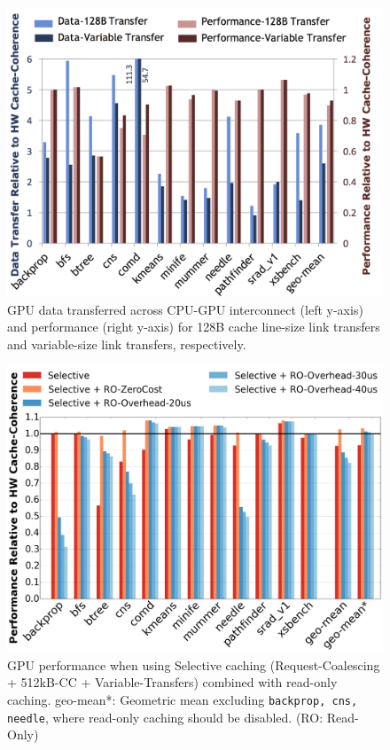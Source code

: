 \begin{figure}[t]
\includegraphics[width=1.0\columnwidth]{figures/linkimprovements.png}
\caption{GPU data transferred across CPU-GPU interconnect (left y-axis) and performance (right y-axis)
for 128B cache line-size link transfers and variable-size link transfers, respectively.}
\label{fig:linkoptimization}
\end{figure}

\begin{figure}[t]
\includegraphics[width=1.0\columnwidth]{figures/readonlycaching.png}
\caption{GPU performance when using Selective caching (Request-Coalescing +
512kB-CC + Variable-Transfers) combined with read-only
caching. geo-mean*: Geometric mean excluding \texttt{backprop, cns,
needle}, where read-only caching should be disabled. (RO: Read-Only)}
\label{fig:readonlycaching}
\vspace{-0.1in}
\end{figure}

